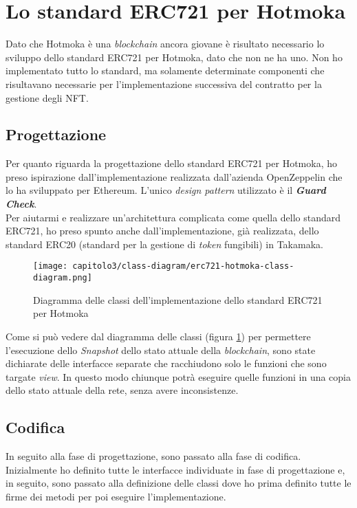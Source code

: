 
\section{Lo standard ERC721 per Hotmoka}
Dato che Hotmoka è una \textit{blockchain} ancora giovane è risultato necessario lo sviluppo dello standard ERC721 per Hotmoka, dato che non ne ha uno. Non ho implementato tutto lo standard, ma solamente determinate componenti che risultavano necessarie per l'implementazione successiva del contratto per la gestione degli NFT.

\subsection{Progettazione}
Per quanto riguarda la progettazione dello standard ERC721 per Hotmoka, ho preso ispirazione dall'implementazione realizzata dall'azienda OpenZeppelin che lo ha sviluppato per Ethereum. L'unico \textit{design pattern} utilizzato è il \textbf{\textit{Guard Check}}. \\

Per aiutarmi e realizzare un'architettura complicata come quella dello standard ERC721, ho preso spunto anche dall'implementazione, già realizzata, dello standard ERC20 (standard per la gestione di \textit{token} fungibili) in Takamaka.

\begin{figure}[h!]
  \centering
  \texttt{[image: capitolo3/class-diagram/erc721-hotmoka-class-diagram.png]}
  \caption{Diagramma delle classi dell'implementazione dello standard ERC721 per Hotmoka}
  \label{fig:erc721-hotmoka-class-diagram}
\end{figure}

Come si può vedere dal diagramma delle classi (figura \ref{fig:erc721-hotmoka-class-diagram}) per permettere l'esecuzione dello \textit{Snapshot} dello stato attuale della \textit{blockchain}, sono state dichiarate delle interfacce separate che racchiudono solo le funzioni che sono targate \textit{view}. In questo modo chiunque potrà eseguire quelle funzioni in una copia dello stato attuale della rete, senza avere inconsistenze.

\subsection{Codifica}
In seguito alla fase di progettazione, sono passato alla fase di codifica.
Inizialmente ho definito tutte le interfacce individuate in fase di progettazione e, in seguito, sono passato alla definizione delle classi dove ho prima definito tutte le firme dei metodi per poi eseguire l'implementazione.

